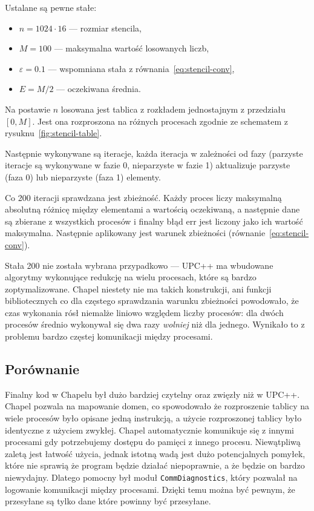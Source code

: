 Ustalane są pewne stałe:
\begin{itemize}
    \item $n=1024\cdot16$ --- rozmiar stencila,
    \item $M=100$ --- maksymalna wartość losowanych liczb,
    \item $\varepsilon=0.1$ --- wspomniana stała z równania~\ref{eq:stencil-conv},
    \item $E=M/2$ --- oczekiwana średnia.
\end{itemize}

Na postawie $n$ losowana jest tablica z rozkładem jednostajnym
z przedziału $[0,M]$.
Jest ona rozproszona na różnych procesach zgodnie ze schematem
z rysuknu~\ref{fig:stencil-table}.

Następnie wykonywane są iteracje, każda iteracja w zależności od fazy
(parzyste iteracje są wykonywane w fazie 0, nieparzyste w fazie 1)
aktualizuje parzyste (faza 0) lub nieparzyste (faza 1) elementy.

Co 200 iteracji sprawdzana jest zbieżność.
Każdy proces liczy maksymalną absolutną różnicę między elementami
a wartością oczekiwaną, a następnie dane są zbierane z wszystkich procesów
i finalny błąd $\text{err}$ jest liczony jako ich wartość maksymalna.
Następnie aplikowany jest warunek zbieżności (równanie~\ref{eq:stencil-conv}).

Stała 200 nie została wybrana przypadkowo --- UPC++ ma wbudowane
algorytmy wykonujące redukcję na wielu procesach, które są bardzo
zoptymalizowane.
Chapel niestety nie ma takich konstrukcji, ani funkcji bibliotecznych
co dla częstego sprawdzania warunku zbieżności
powodowało, że czas wykonania rósł
niemalże liniowo względem liczby procesów:
dla dwóch procesów średnio wykonywał się dwa razy \textit{wolniej}
niż dla jednego.
Wynikało to z problemu bardzo częstej komunikacji między procesami.

\subsection{Porównanie}

Finalny kod w Chapelu był dużo bardziej czytelny
oraz zwięzły niż w UPC++.
Chapel pozwala na mapowanie domen, co spowodowało że
rozproszenie tablicy na wiele procesów było opisane jedną
instrukcją, a użycie rozproszonej tablicy było identyczne
z użyciem zwykłej.
Chapel automatycznie komunikuje się z innymi procesami gdy
potrzebujemy dostępu do pamięci z innego procesu.
Niewątpliwą zaletą jest łatwość użycia, jednak
istotną wadą jest dużo potencjalnych pomyłek, które nie sprawią
że program będzie działać niepoprawnie,
a że będzie on bardzo niewydajny.
Dlatego pomocny był moduł \texttt{CommDiagnostics}, który
pozwalał na logowanie komunikacji między procesami.
Dzięki temu można być pewnym, że przesyłane są tylko
dane które powinny być przesyłane.

